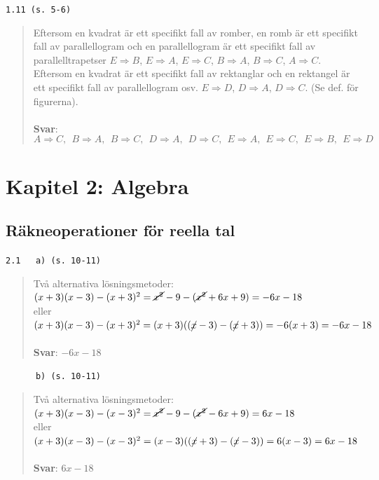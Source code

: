 \documentclass[a4paper]{article}
\newcommand{\tskcol}[1]{\textcolor{tskcol}{#1}}
\begin{document}
	\texttt{\tskcol{1.11 (s. 5-6)}}
	\begin{quotation}
		\noindent
		Eftersom en kvadrat är ett specifikt fall av romber, en romb är ett specifikt fall av parallellogram och en parallellogram är ett specifikt fall av parallelltrapetser $E \Rightarrow B$, $E \Rightarrow A$, $E \Rightarrow C$, $B \Rightarrow A$, $B \Rightarrow C$, $A \Rightarrow C$.\\
		Eftersom en kvadrat är ett specifikt fall av rektanglar och en rektangel är ett specifikt fall av parallellogram osv. $E \Rightarrow D$, $D \Rightarrow A$, $D \Rightarrow C$. (Se def. för figurerna).
		\\ \\
		\textbf{Svar}: 
		\[A \Rightarrow C,~~ B \Rightarrow A,~~ B \Rightarrow C,~~ D \Rightarrow A,~~ D \Rightarrow C,~~ E \Rightarrow A,~~ E \Rightarrow C,~~ E \Rightarrow B,~~ E \Rightarrow D\]
	\end{quotation}
	
	\pagebreak
	\section*{Kapitel 2: Algebra}
	\subsection*{Räkneoperationer för reella tal}
	
	\texttt{\tskcol{2.1~~~a) (s. 10-11)}}
	\begin{quotation}
		\noindent
		Två alternativa lösningsmetoder: \\
		$(x+3)(x-3)-(x+3)^2=\cancel{x^2}-9-(\cancel{x^2}+6x+9)=-6x-18$ \\
		eller \\
		$(x+3)(x-3)-(x+3)^2=(x+3)((\cancel{x}-3)-(\cancel{x}+3))=-6(x+3)=-6x-18$
		\\ \\
		\textbf{Svar}: $-6x-18$
	\end{quotation}
	
	\texttt{\tskcol{~~~~~~b) (s. 10-11)}}
	\begin{quotation}
		\noindent
		Två alternativa lösningsmetoder: \\
		$(x+3)(x-3)-(x-3)^2=\cancel{x^2}-9-(\cancel{x^2}-6x+9)=6x-18$ \\
		eller \\
		$(x+3)(x-3)-(x-3)^2=(x-3)((\cancel{x}+3)-(\cancel{x}-3))=6(x-3)=6x-18$
		\\ \\
		\textbf{Svar}: $6x-18$
	\end{quotation}
	
\end{document}
